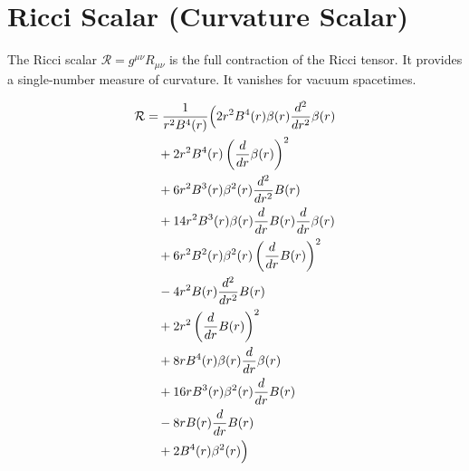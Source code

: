 \documentclass[11pt,a4paper]{article}
\begin{document}
\section{Ricci Scalar (Curvature Scalar)}
The Ricci scalar $\mathcal{R} = g^{\mu\nu} R_{\mu\nu}$ is the full contraction of the Ricci tensor. It provides a single-number measure of curvature. It vanishes for vacuum spacetimes.
\begin{tcolorbox}[colback=boxblue,colframe=black!40,title=\textbf{Ricci scalar},breakable]
\begin{align*}
  \mathcal{R} &= \frac{1}{r^{2} B^{4}{\left(r \right)}}\Bigl(2 r^{2} B^{4}{\left(r \right)} \beta{\left(r \right)} \frac{d^{2}}{d r^{2}} \beta{\left(r \right)} \\
  &\quad + 2 r^{2} B^{4}{\left(r \right)} \left(\frac{d}{d r} \beta{\left(r \right)}\right)^{2} \\
  &\quad + 6 r^{2} B^{3}{\left(r \right)} \beta^{2}{\left(r \right)} \frac{d^{2}}{d r^{2}} B{\left(r \right)} \\
  &\quad + 14 r^{2} B^{3}{\left(r \right)} \beta{\left(r \right)} \frac{d}{d r} B{\left(r \right)} \frac{d}{d r} \beta{\left(r \right)} \\
  &\quad + 6 r^{2} B^{2}{\left(r \right)} \beta^{2}{\left(r \right)} \left(\frac{d}{d r} B{\left(r \right)}\right)^{2} \\
  &\quad - 4 r^{2} B{\left(r \right)} \frac{d^{2}}{d r^{2}} B{\left(r \right)} \\
  &\quad + 2 r^{2} \left(\frac{d}{d r} B{\left(r \right)}\right)^{2} \\
  &\quad + 8 r B^{4}{\left(r \right)} \beta{\left(r \right)} \frac{d}{d r} \beta{\left(r \right)} \\
  &\quad + 16 r B^{3}{\left(r \right)} \beta^{2}{\left(r \right)} \frac{d}{d r} B{\left(r \right)} \\
  &\quad - 8 r B{\left(r \right)} \frac{d}{d r} B{\left(r \right)} \\
  &\quad + 2 B^{4}{\left(r \right)} \beta^{2}{\left(r \right)}\Bigr)
\end{align*}
\end{tcolorbox}
\end{document}
